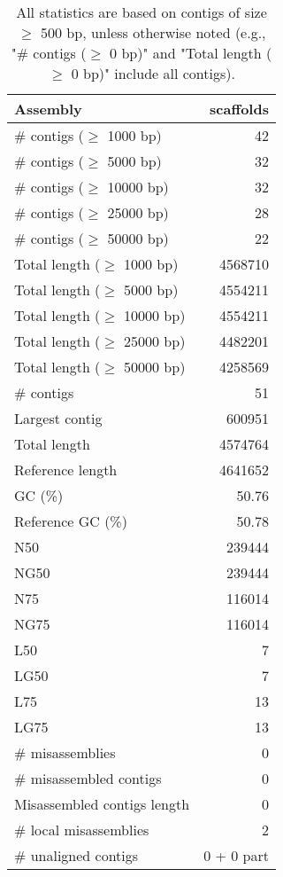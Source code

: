 \documentclass[12pt,a4paper]{article}
\begin{document}
\begin{table}[ht]
\begin{center}
\caption{All statistics are based on contigs of size $\geq$ 500 bp, unless otherwise noted (e.g., "\# contigs ($\geq$ 0 bp)" and "Total length ($\geq$ 0 bp)" include all contigs).}
\begin{tabular}{|l*{1}{|r}|}
\hline
Assembly & scaffolds \\ \hline
\# contigs ($\geq$ 1000 bp) & 42 \\ \hline
\# contigs ($\geq$ 5000 bp) & 32 \\ \hline
\# contigs ($\geq$ 10000 bp) & 32 \\ \hline
\# contigs ($\geq$ 25000 bp) & 28 \\ \hline
\# contigs ($\geq$ 50000 bp) & 22 \\ \hline
Total length ($\geq$ 1000 bp) & 4568710 \\ \hline
Total length ($\geq$ 5000 bp) & 4554211 \\ \hline
Total length ($\geq$ 10000 bp) & 4554211 \\ \hline
Total length ($\geq$ 25000 bp) & 4482201 \\ \hline
Total length ($\geq$ 50000 bp) & 4258569 \\ \hline
\# contigs & 51 \\ \hline
Largest contig & 600951 \\ \hline
Total length & 4574764 \\ \hline
Reference length & 4641652 \\ \hline
GC (\%) & 50.76 \\ \hline
Reference GC (\%) & 50.78 \\ \hline
N50 & 239444 \\ \hline
NG50 & 239444 \\ \hline
N75 & 116014 \\ \hline
NG75 & 116014 \\ \hline
L50 & 7 \\ \hline
LG50 & 7 \\ \hline
L75 & 13 \\ \hline
LG75 & 13 \\ \hline
\# misassemblies & 0 \\ \hline
\# misassembled contigs & 0 \\ \hline
Misassembled contigs length & 0 \\ \hline
\# local misassemblies & 2 \\ \hline
\# unaligned contigs & 0 + 0 part \\ \hline

\end{tabular}
\end{center}
\end{table}
\end{document}
